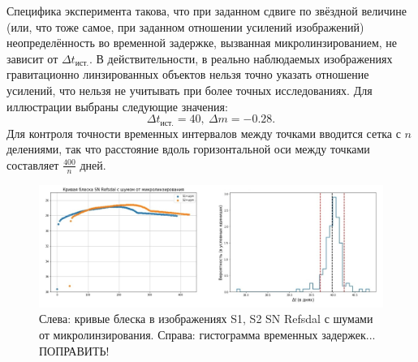 Специфика эксперимента такова, что при заданном сдвиге по звёздной величине (или, что тоже самое, при заданном отношении усилений изображений) неопределённость во временной задержке, вызванная микролинзированием, не зависит от $\Delta t_{\textrm{ист.}}$. В действительности, в реально наблюдаемых изображениях гравитационно линзированных объектов нельзя точно указать отношение усилений, что нельзя не учитывать при более точных исследованиях. Для иллюстрации выбраны следующие значения: $$\Delta t_{\textrm{ист.}}=40, \ \Delta m = -0.28.$$
Для контроля точности временных интервалов между точками вводится сетка с $n$ делениями, так что расстояние вдоль горизонтальной оси между точками составляет $\frac{400}{n}$ дней.

\begin{figure}[H]
    \centering
	\includegraphics[scale=0.5]{pics/fig10.png}
	\caption{Слева: кривые блеска в изображениях S1, S2 SN Refsdal с шумами от микролинзирования. Справа: гистограмма временных задержек... ПОПРАВИТЬ! \label{fig:proba}} 
\end{figure}